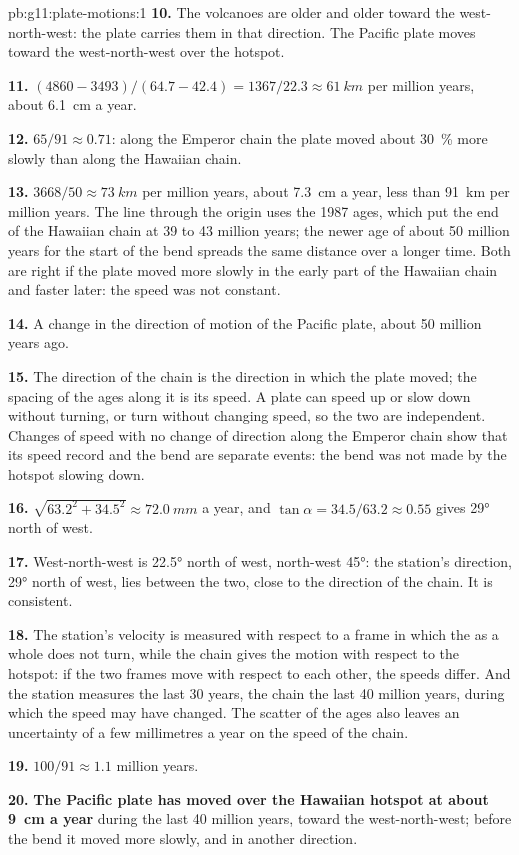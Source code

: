 \begin{solution}{pb:g11:plate-motions:1}
\textbf{10.} The volcanoes are older and older toward the west-north-west:
the plate carries them in that direction. The Pacific plate moves toward the
west-north-west over the hotspot.

\textbf{11.} $(4860 - 3493)/(64.7 - 42.4) = 1367/22.3 \approx \qty{61}{km}$
per million years, about \qty{6.1}{cm} a year.

\textbf{12.} $65/91 \approx 0.71$: along the Emperor chain the plate moved
about \qty{30}{\percent} more slowly than along the Hawaiian chain.

\textbf{13.} $3668/50 \approx \qty{73}{km}$ per million years, about
\qty{7.3}{cm} a year, less than \qty{91}{km} per million years. The line through the origin
uses the 1987 ages, which put the end of the Hawaiian chain at 39 to 43
million years; the newer age of about 50 million years for the start of the
bend spreads the same distance over a longer time. Both are right if the plate
moved more slowly in the early part of the Hawaiian chain and faster later:
the speed was not constant.

\textbf{14.} A change in the direction of motion of the Pacific plate, about
50 million years ago.

\textbf{15.} The direction of the chain is the direction in which the plate
moved; the spacing of the ages along it is its speed. A plate can speed up or
slow down without turning, or turn without changing speed, so the two are
independent. Changes of speed with no change of direction along the Emperor
chain show that its speed record and the bend are separate events: the bend
was not made by the hotspot slowing down.

\textbf{16.} $\sqrt{63.2^2 + 34.5^2} \approx \qty{72.0}{mm}$ a year, and
$\tan\alpha = 34.5/63.2 \approx 0.55$ gives \ang{29} north of west.

\textbf{17.} West-north-west is \ang{22.5} north of west, north-west
\ang{45}: the station's direction, \ang{29} north of west, lies between the
two, close to the direction of the chain. It is consistent.

\textbf{18.} The station's velocity is measured with respect to a frame in
which the  as a whole does not turn, while the chain gives the
motion with respect to the hotspot: if the two frames move with respect to
each other, the speeds differ. And the station measures the last 30 years,
the chain the last 40 million years, during which the speed may have changed.
The scatter of the ages also leaves an uncertainty of a few millimetres a
year on the speed of the chain.

\textbf{19.} $100/91 \approx 1.1$ million years.

\textbf{20.} \textbf{The Pacific plate has moved over the Hawaiian hotspot at
about \qty{9}{cm} a year} during the last 40 million years, toward the
west-north-west; before the bend it moved more slowly, and in another
direction.
\end{solution}
